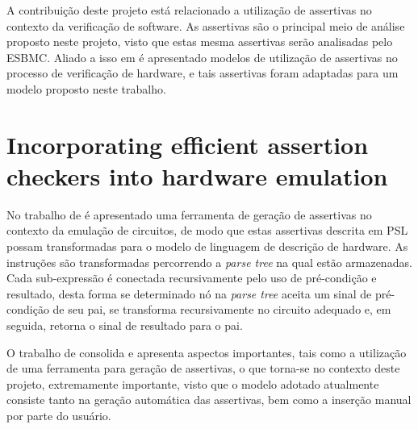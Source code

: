 \par
A contribuição deste projeto está relacionado a utilização de assertivas no contexto da verificação de software. As assertivas são o principal meio de análise proposto neste projeto, visto que estas mesma assertivas serão analisadas pelo ESBMC. Aliado a isso em  é apresentado modelos de utilização de assertivas no processo de verificação de hardware, e tais assertivas foram adaptadas para um modelo proposto neste trabalho.

\section{Incorporating efficient assertion checkers into hardware emulation}
\par
No trabalho de  é apresentado uma ferramenta de geração de assertivas no contexto da emulação de circuitos, de modo que estas assertivas descrita em PSL possam transformadas para o modelo de linguagem de descrição de hardware. As instruções são transformadas percorrendo a \textit{parse tree} na qual estão armazenadas. Cada sub-expressão é conectada recursivamente pelo uso de pré-condição e resultado, desta forma se determinado nó na \textit{parse tree} aceita um sinal de pré-condição de seu pai, se transforma recursivamente no circuito adequado e, em seguida, retorna o sinal de resultado para o pai.

\par
O trabalho de  consolida e apresenta aspectos importantes, tais como a utilização de uma ferramenta para geração de assertivas, o que torna-se no contexto deste projeto, extremamente importante, visto que o modelo adotado atualmente consiste tanto na geração automática das assertivas, bem como a inserção manual por parte do usuário.
